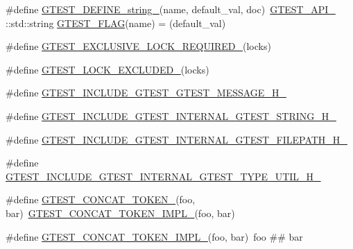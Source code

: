 \begin{DoxyCompactItemize}
\item 
\#define \hyperlink{fused-src_2gtest_2gtest_8h_a885e18fe217a6e85553d408b99252c12}{G\-T\-E\-S\-T\-\_\-\-D\-E\-F\-I\-N\-E\-\_\-string\-\_\-}(name, default\-\_\-val, doc)~\hyperlink{gtest-port_8h_aa73be6f0ba4a7456180a94904ce17790}{G\-T\-E\-S\-T\-\_\-\-A\-P\-I\-\_\-} \-::std\-::string \hyperlink{gtest__output__test___8cc_a448e05d56107d7550bea141e0f7a73d3}{G\-T\-E\-S\-T\-\_\-\-F\-L\-A\-G}(name) = (default\-\_\-val)
\item 
\#define \hyperlink{fused-src_2gtest_2gtest_8h_a149f693bd59fa1bc937af54c0cdcb32f}{G\-T\-E\-S\-T\-\_\-\-E\-X\-C\-L\-U\-S\-I\-V\-E\-\_\-\-L\-O\-C\-K\-\_\-\-R\-E\-Q\-U\-I\-R\-E\-D\-\_\-}(locks)
\item 
\#define \hyperlink{fused-src_2gtest_2gtest_8h_a69abff5a4efdd07bd5faebe3dd318d06}{G\-T\-E\-S\-T\-\_\-\-L\-O\-C\-K\-\_\-\-E\-X\-C\-L\-U\-D\-E\-D\-\_\-}(locks)
\item 
\#define \hyperlink{fused-src_2gtest_2gtest_8h_a5c2d86823d7f9ffac3e3766da17091dd}{G\-T\-E\-S\-T\-\_\-\-I\-N\-C\-L\-U\-D\-E\-\_\-\-G\-T\-E\-S\-T\-\_\-\-G\-T\-E\-S\-T\-\_\-\-M\-E\-S\-S\-A\-G\-E\-\_\-\-H\-\_\-}
\item 
\#define \hyperlink{fused-src_2gtest_2gtest_8h_af7adda0fee2a48fec4d8628cbaedec76}{G\-T\-E\-S\-T\-\_\-\-I\-N\-C\-L\-U\-D\-E\-\_\-\-G\-T\-E\-S\-T\-\_\-\-I\-N\-T\-E\-R\-N\-A\-L\-\_\-\-G\-T\-E\-S\-T\-\_\-\-S\-T\-R\-I\-N\-G\-\_\-\-H\-\_\-}
\item 
\#define \hyperlink{fused-src_2gtest_2gtest_8h_aa6f5334cb6792f48ac5621193b41bb61}{G\-T\-E\-S\-T\-\_\-\-I\-N\-C\-L\-U\-D\-E\-\_\-\-G\-T\-E\-S\-T\-\_\-\-I\-N\-T\-E\-R\-N\-A\-L\-\_\-\-G\-T\-E\-S\-T\-\_\-\-F\-I\-L\-E\-P\-A\-T\-H\-\_\-\-H\-\_\-}
\item 
\#define \hyperlink{fused-src_2gtest_2gtest_8h_aff22afce4bffd0181c178e2e4d848c97}{G\-T\-E\-S\-T\-\_\-\-I\-N\-C\-L\-U\-D\-E\-\_\-\-G\-T\-E\-S\-T\-\_\-\-I\-N\-T\-E\-R\-N\-A\-L\-\_\-\-G\-T\-E\-S\-T\-\_\-\-T\-Y\-P\-E\-\_\-\-U\-T\-I\-L\-\_\-\-H\-\_\-}
\item 
\#define \hyperlink{fused-src_2gtest_2gtest_8h_ae3c336cbe1ae2bd1b1d019333e4428a0}{G\-T\-E\-S\-T\-\_\-\-C\-O\-N\-C\-A\-T\-\_\-\-T\-O\-K\-E\-N\-\_\-}(foo, bar)~\hyperlink{gtest-internal_8h_aa39fb5346d3573feebe4257cb3a01fde}{G\-T\-E\-S\-T\-\_\-\-C\-O\-N\-C\-A\-T\-\_\-\-T\-O\-K\-E\-N\-\_\-\-I\-M\-P\-L\-\_\-}(foo, bar)
\item 
\#define \hyperlink{fused-src_2gtest_2gtest_8h_aa39fb5346d3573feebe4257cb3a01fde}{G\-T\-E\-S\-T\-\_\-\-C\-O\-N\-C\-A\-T\-\_\-\-T\-O\-K\-E\-N\-\_\-\-I\-M\-P\-L\-\_\-}(foo, bar)~foo \#\# bar

\end{DoxyCompactItemize}
